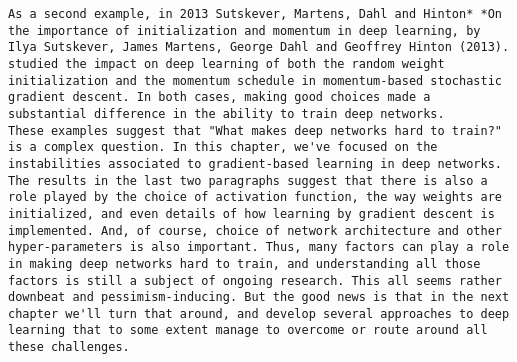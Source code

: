 \begin{lstlisting}
As a second example, in 2013 Sutskever, Martens, Dahl and Hinton* *On the importance of initialization and momentum in deep learning, by Ilya Sutskever, James Martens, George Dahl and Geoffrey Hinton (2013). studied the impact on deep learning of both the random weight initialization and the momentum schedule in momentum-based stochastic gradient descent. In both cases, making good choices made a substantial difference in the ability to train deep networks.
These examples suggest that "What makes deep networks hard to train?" is a complex question. In this chapter, we've focused on the instabilities associated to gradient-based learning in deep networks. The results in the last two paragraphs suggest that there is also a role played by the choice of activation function, the way weights are initialized, and even details of how learning by gradient descent is implemented. And, of course, choice of network architecture and other hyper-parameters is also important. Thus, many factors can play a role in making deep networks hard to train, and understanding all those factors is still a subject of ongoing research. This all seems rather downbeat and pessimism-inducing. But the good news is that in the next chapter we'll turn that around, and develop several approaches to deep learning that to some extent manage to overcome or route around all these challenges.


\end{lstlisting}
